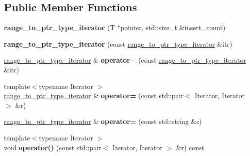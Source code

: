 \subsection*{Public Member Functions}
\begin{DoxyCompactItemize}
\item 
\hypertarget{classstrtk_1_1range__to__ptr__type__iterator_a46f717471fa10adb53b3da3490d43992}{{\bfseries range\-\_\-to\-\_\-ptr\-\_\-type\-\_\-iterator} (T $\ast$pointer, std\-::size\-\_\-t \&insert\-\_\-count)}\label{classstrtk_1_1range__to__ptr__type__iterator_a46f717471fa10adb53b3da3490d43992}

\item 
\hypertarget{classstrtk_1_1range__to__ptr__type__iterator_acac3919cea1a78cadb6c761ecc152e2c}{{\bfseries range\-\_\-to\-\_\-ptr\-\_\-type\-\_\-iterator} (const \hyperlink{classstrtk_1_1range__to__ptr__type__iterator}{range\-\_\-to\-\_\-ptr\-\_\-type\-\_\-iterator} \&itr)}\label{classstrtk_1_1range__to__ptr__type__iterator_acac3919cea1a78cadb6c761ecc152e2c}

\item 
\hypertarget{classstrtk_1_1range__to__ptr__type__iterator_a3ea71701ab3abe434dc8a79956b03e06}{\hyperlink{classstrtk_1_1range__to__ptr__type__iterator}{range\-\_\-to\-\_\-ptr\-\_\-type\-\_\-iterator} \& {\bfseries operator=} (const \hyperlink{classstrtk_1_1range__to__ptr__type__iterator}{range\-\_\-to\-\_\-ptr\-\_\-type\-\_\-iterator} \&itr)}\label{classstrtk_1_1range__to__ptr__type__iterator_a3ea71701ab3abe434dc8a79956b03e06}

\item 
\hypertarget{classstrtk_1_1range__to__ptr__type__iterator_ad0f04f4f9663ba5a0e49eef84a4f0122}{{\footnotesize template$<$typename Iterator $>$ }\\\hyperlink{classstrtk_1_1range__to__ptr__type__iterator}{range\-\_\-to\-\_\-ptr\-\_\-type\-\_\-iterator} \& {\bfseries operator=} (const std\-::pair$<$ Iterator, Iterator $>$ \&r)}\label{classstrtk_1_1range__to__ptr__type__iterator_ad0f04f4f9663ba5a0e49eef84a4f0122}

\item 
\hypertarget{classstrtk_1_1range__to__ptr__type__iterator_a1378342a0247b8398ccf4980b9afa189}{\hyperlink{classstrtk_1_1range__to__ptr__type__iterator}{range\-\_\-to\-\_\-ptr\-\_\-type\-\_\-iterator} \& {\bfseries operator=} (const std\-::string \&s)}\label{classstrtk_1_1range__to__ptr__type__iterator_a1378342a0247b8398ccf4980b9afa189}

\item 
\hypertarget{classstrtk_1_1range__to__ptr__type__iterator_a9a835ce6a8113b2b5d45c29af8c4a136}{{\footnotesize template$<$typename Iterator $>$ }\\void {\bfseries operator()} (const std\-::pair$<$ Iterator, Iterator $>$ \&r) const }\label{classstrtk_1_1range__to__ptr__type__iterator_a9a835ce6a8113b2b5d45c29af8c4a136}


\end{DoxyCompactItemize}
